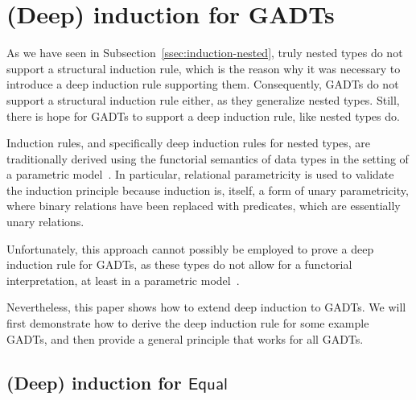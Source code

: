 \documentclass[acmsmall,screen,review,anonymous]{acmart}
\theoremstyle{definition}
\begin{document}
\section{(Deep) induction for GADTs}


As we have seen in Subsection~\ref{ssec:induction-nested},
truly nested types do not support a structural induction rule,
which is the reason why it was necessary to introduce a deep induction rule supporting them.
Consequently, GADTs do not support a structural induction rule either,
as they generalize nested types.
Still, there is hope for GADTs to support a deep induction rule,
like nested types do.

Induction rules, and specifically deep induction rules for nested types,
are traditionally derived using the functorial semantics of data types
in the setting of a parametric model~\cite{jp20}.
In particular, relational parametricity is used to validate the induction principle because induction is, itself,
a form of unary parametricity, where binary relations have been replaced with predicates,
which are essentially unary relations.

Unfortunately, this approach cannot possibly be employed
to prove a deep induction rule for GADTs,
as these types do not allow for a functorial interpretation,
at least in a parametric model~\cite{Haskell-paper}.

Nevertheless, this paper shows how to extend deep induction to GADTs.
We will first demonstrate how to derive the deep induction rule for some example GADTs,
and then provide a general principle that works for all GADTs.



\subsection{(Deep) induction for $\mathsf{Equal}$}
\end{document}
